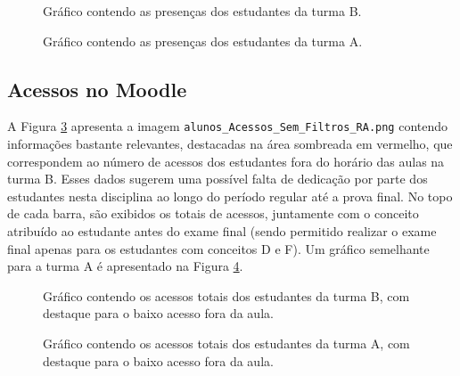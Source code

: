 \begin{figure}[!ht]
    \centering
    \caption{Gráfico contendo as presenças dos estudantes da turma B.}
    \label{fig:ApeA_alunos_Total_Presencas_RA}
\end{figure}

\begin{figure}[!ht]
    \centering
    \caption{Gráfico contendo as presenças dos estudantes da turma A.}
    \label{fig:ApeA_alunos_Total_Presencas_RA_Turma_A}
\end{figure}



\subsection{Acessos no Moodle}

A Figura \ref{fig:ApeA_alunos_Acessos_Sem_Filtros_RA} apresenta a imagem \verb|alunos_Acessos_Sem_Filtros_RA.png| contendo informa\-ções bastante relevantes, destacadas na área sombreada em vermelho, que correspondem ao número de acessos dos estudantes fora do horário das aulas na turma B. Esses dados sugerem uma possível falta de dedicação por parte dos estudantes nesta disciplina ao longo do período regular até a prova final. No topo de cada barra, são exibidos os totais de acessos, juntamente com o conceito atribuído ao estudante antes do exame final (sendo permitido realizar o exame final apenas para os estudantes com conceitos D e F). Um gráfico semelhante para a turma A é apresentado na Figura \ref{fig:ApeA_alunos_Acessos_Sem_Filtros_RA_Turma_A}.

\begin{figure}[!ht]
    \centering
    \caption{Gráfico contendo os acessos totais dos estudantes da turma B, com destaque para o baixo acesso fora da aula.}
    \label{fig:ApeA_alunos_Acessos_Sem_Filtros_RA}
\end{figure}

\begin{figure}[!ht]
    \centering
    \caption{Gráfico contendo os acessos totais dos estudantes da turma A, com destaque para o baixo acesso fora da aula.}
    \label{fig:ApeA_alunos_Acessos_Sem_Filtros_RA_Turma_A}
\end{figure}


